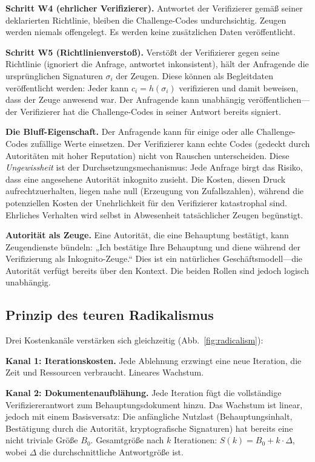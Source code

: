 \documentclass[11pt,a4paper,twocolumn]{article}
\begin{document}
\textbf{Schritt W4 (ehrlicher Verifizierer).} Antwortet der Verifizierer gemäß seiner deklarierten Richtlinie, bleiben die Challenge-Codes undurchsichtig. Zeugen werden niemals offengelegt. Es werden keine zusätzlichen Daten veröffentlicht.

\textbf{Schritt W5 (Richtlinienverstoß).} Verstößt der Verifizierer gegen seine Richtlinie (ignoriert die Anfrage, antwortet inkonsistent), hält der Anfragende die ursprünglichen Signaturen $\sigma_i$ der Zeugen. Diese können als Begleitdaten veröffentlicht werden: Jeder kann $c_i = h(\sigma_i)$ verifizieren und damit beweisen, dass der Zeuge anwesend war. Der Anfragende kann unabhängig veröffentlichen---der Verifizierer hat die Challenge-Codes in seiner Antwort bereits signiert.

\textbf{Die Bluff-Eigenschaft.} Der Anfragende kann für einige oder alle Challenge-Codes zufällige Werte einsetzen. Der Verifizierer kann echte Codes (gedeckt durch Autoritäten mit hoher Reputation) nicht von Rauschen unterscheiden. Diese \emph{Ungewissheit} ist der Durchsetzungsmechanismus: Jede Anfrage birgt das Risiko, dass eine angesehene Autorität inkognito zusieht. Die Kosten, diesen Druck aufrechtzuerhalten, liegen nahe null (Erzeugung von Zufallszahlen), während die potenziellen Kosten der Unehrlichkeit für den Verifizierer katastrophal sind. Ehrliches Verhalten wird selbst in Abwesenheit tatsächlicher Zeugen begünstigt.

\textbf{Autorität als Zeuge.} Eine Autorität, die eine Behauptung bestätigt, kann Zeugendienste bündeln: „Ich bestätige Ihre Behauptung und diene während der Verifizierung als Inkognito-Zeuge.“ Dies ist ein natürliches Geschäftsmodell---die Autorität verfügt bereits über den Kontext. Die beiden Rollen sind jedoch logisch unabhängig.

\subsection{Prinzip des teuren Radikalismus}

Drei Kostenkanäle verstärken sich gleichzeitig (Abb.~\ref{fig:radicalism}):

\textbf{Kanal 1: Iterationskosten.} Jede Ablehnung erzwingt eine neue Iteration, die Zeit und Ressourcen verbraucht. Lineares Wachstum.

\textbf{Kanal 2: Dokumentenaufblähung.} Jede Iteration fügt die vollständige Verifiziererantwort zum Behauptungsdokument hinzu. Das Wachstum ist linear, jedoch mit einem Basisversatz: Die anfängliche Nutzlast (Behauptungsinhalt, Bestätigung durch die Autorität, kryptografische Signaturen) hat bereits eine nicht triviale Größe $B_0$. Gesamtgröße nach $k$ Iterationen: $S(k) = B_0 + k \cdot \Delta$, wobei $\Delta$ die durchschnittliche Antwortgröße ist.
\end{document}
